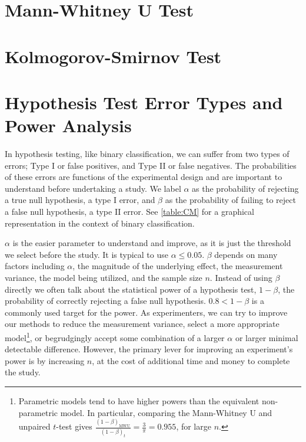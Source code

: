 \section{Mann-Whitney U Test}
\label{hypo:mann_whitney_U_test}

\section{Kolmogorov-Smirnov Test}
\label{hypo:KS_test}

\section{Hypothesis Test Error Types and Power Analysis}
\label{hypo:power}

In hypothesis testing, like binary classification, we can suffer from two types of errors;
Type I or false positives, and Type II or false negatives.
The probabilities of these errors are functions of the experimental design
and are important to understand before undertaking a study.
We label $\alpha$ as the probability of rejecting a true null hypothesis, \ie a type I error,
and $\beta$ as the probability of failing to reject a false null hypothesis, \ie a type II error.
See \cref{table:CM} for a graphical representation in the context of binary classification.

$\alpha$ is the easier parameter to understand and improve,
as it is just the \pvalue threshold we select before the study.
It is typical to use $\alpha \leq \num{0.05}$.
$\beta$ depends on many factors including
$\alpha$,
the magnitude of the underlying effect,
the measurement variance,
the model being utilized,
and the sample size $n$.
Instead of using $\beta$ directly we often talk about the statistical power of a hypothesis test, $1-\beta$,
\ie the probability of correctly rejecting a false null hypothesis.
$\num{0.8} < 1-\beta$ is a commonly used target for the power.
As experimenters, we can
try to improve our methods to reduce the measurement variance,
select a more appropriate model\footnote{Parametric
models tend to have higher powers than the equivalent non-parametric model.
In particular, comparing
the Mann-Whitney U and unpaired $t$-test gives $\frac{\left(1-\beta\right)_{\text{MWU}}}{\left(1-\beta\right)_{t}} = \frac{3}{\pi} = \num{0.955}$,
for large $n$.},
or begrudgingly accept some combination of a larger $\alpha$ or larger minimal detectable difference.
However, the primary lever for improving an experiment's power is by increasing $n$,
at the cost of additional time and money to complete the study.

